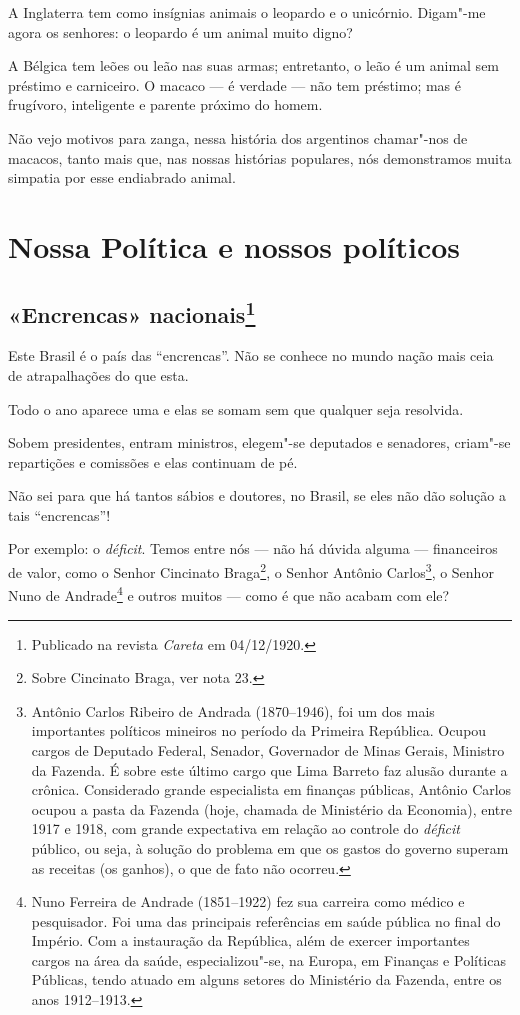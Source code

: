 A Inglaterra tem como insígnias animais o leopardo e o unicórnio.
Digam"-me agora os senhores: o leopardo é um animal muito digno?

A Bélgica tem leões ou leão nas suas armas; entretanto, o leão é um
animal sem préstimo e carniceiro. O macaco --- é verdade --- não tem
préstimo; mas é frugívoro, inteligente e parente próximo do homem.

Não vejo motivos para zanga, nessa história dos argentinos chamar"-nos de
macacos, tanto mais que, nas nossas histórias populares, nós
demonstramos muita simpatia por esse endiabrado animal.



\part{Nossa Política e nossos políticos }

\chapter[«Encrencas» nacionais]{«Encrencas» nacionais\footnote[*]{Publicado na revista \emph{Careta} em 04/12/1920.}}

Este Brasil é o país das ``encrencas''. Não se conhece no mundo nação
mais ceia de atrapalhações do que esta.

Todo o ano aparece uma e elas se somam sem que qualquer seja resolvida.

Sobem presidentes, entram ministros, elegem"-se deputados e senadores,
criam"-se repartições e comissões e elas continuam de pé.

Não sei para que há tantos sábios e doutores, no Brasil, se eles não dão
solução a tais ``encrencas''!

Por exemplo: o \emph{déficit}. Temos entre nós --- não há dúvida alguma
--- financeiros de valor, como o Senhor Cincinato Braga\footnote{Sobre
  Cincinato Braga, ver nota 23.}, o Senhor Antônio Carlos\footnote{Antônio
  Carlos Ribeiro de Andrada (1870--1946), foi um dos mais importantes
  políticos mineiros no período da Primeira República. Ocupou cargos de
  Deputado Federal, Senador, Governador de Minas Gerais, Ministro da
  Fazenda. É sobre este último cargo que Lima Barreto faz alusão durante
  a crônica. Considerado grande especialista em finanças públicas,
  Antônio Carlos ocupou a pasta da Fazenda (hoje, chamada de Ministério
  da Economia), entre 1917 e 1918, com grande expectativa em relação ao
  controle do \emph{déficit} público, ou seja, à solução do problema em
  que os gastos do governo superam as receitas (os ganhos), o que de
  fato não ocorreu.}, o Senhor Nuno de Andrade\footnote{Nuno Ferreira de
  Andrade (1851--1922) fez sua carreira como médico e pesquisador. Foi
  uma das principais referências em saúde pública no final do Império.
  Com a instauração da República, além de exercer importantes cargos na
  área da saúde, especializou"-se, na Europa, em Finanças e Políticas
  Públicas, tendo atuado em alguns setores do Ministério da Fazenda,
  entre os anos 1912--1913.} e outros muitos --- como é que não acabam
com ele?

